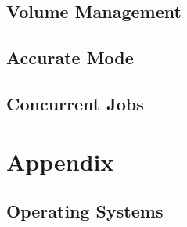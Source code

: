 \documentclass[10pt,a4paper]{book}
\begin{document}






\chapter{Volume Management}
  
  









\chapter{Accurate Mode}
    \label{accuratemode}



\chapter{Concurrent Jobs}
    \label{ConcurrentJobs}













\appendix
\part{Appendix}



\chapter{Operating Systems}
\label{SupportedOSes}

    

%
%

%
\end{document}
